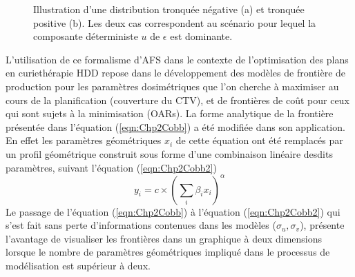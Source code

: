 \begin{figure}[ht!]
  \centering
  \hspace{0.5cm}
\caption{\label{DensiteProb} Illustration d'une distribution tronquée négative (a) et tronquée positive (b). Les deux cas correspondent au scénario pour lequel la composante déterministe $u$ de $\epsilon$ est dominante.}
\end{figure}
%
L’utilisation de ce formalisme d'AFS dans le contexte de l’optimisation des plans en curiethérapie HDD repose dans le développement des modèles de frontière de production pour les paramètres dosimétriques que l’on cherche à maximiser au cours de la planification (couverture du CTV), et de frontières de coût pour ceux qui sont sujets à la minimisation (OARs). La forme analytique de la frontière présentée dans l’équation (\ref{eqn:Chp2Cobb}) a été modifiée dans son application. En effet les paramètres géométriques $x_{i}$ de cette équation ont été remplacés par un profil géométrique construit sous forme d’une combinaison linéaire desdits paramètres, suivant l’équation (\ref{eqn:Chp2Cobb2})
%
\begin{equation}\label{eqn:Chp2Cobb2}
	y_{i} = c\times \left(\sum_{i}\beta_{i}x_{i}\right)^{\alpha}
\end{equation}
%
Le passage de l’équation (\ref{eqn:Chp2Cobb}) à l’équation (\ref{eqn:Chp2Cobb2}) qui s’est fait sans perte d’informations contenues dans les modèles ($\sigma_{u}, \sigma_{v}$), présente l’avantage de visualiser les frontières dans un graphique à deux dimensions lorsque le nombre de paramètres géométriques impliqué dans le processus de modélisation est supérieur à deux.
%
